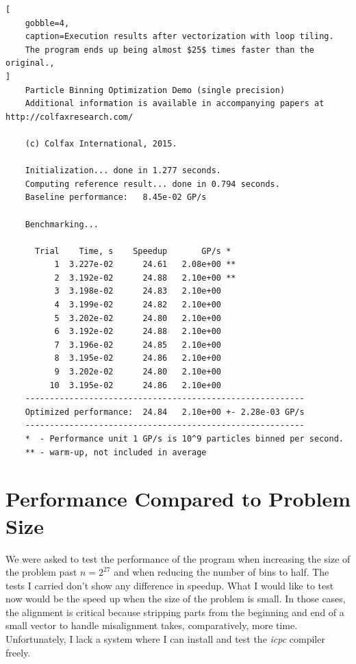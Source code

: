 \documentclass[
    12pt, %
]{fphw}
\newcommand{\icpc}{\textit{icpc}}
\begin{document}
\begin{lstlisting}[
    gobble=4,
    caption=Execution results after vectorization with loop tiling.
    The program ends up being almost $25$ times faster than the original.,
]
    Particle Binning Optimization Demo (single precision)
    Additional information is available in accompanying papers at http://colfaxresearch.com/

    (c) Colfax International, 2015.

    Initialization... done in 1.277 seconds.
    Computing reference result... done in 0.794 seconds.
    Baseline performance:   8.45e-02 GP/s

    Benchmarking...

      Trial    Time, s    Speedup       GP/s *
          1  3.227e-02      24.61   2.08e+00 **
          2  3.192e-02      24.88   2.10e+00 **
          3  3.198e-02      24.83   2.10e+00 
          4  3.199e-02      24.82   2.10e+00 
          5  3.202e-02      24.80   2.10e+00 
          6  3.192e-02      24.88   2.10e+00 
          7  3.196e-02      24.85   2.10e+00 
          8  3.195e-02      24.86   2.10e+00 
          9  3.202e-02      24.80   2.10e+00 
         10  3.195e-02      24.86   2.10e+00 
    ---------------------------------------------------------
    Optimized performance:  24.84   2.10e+00 +- 2.28e-03 GP/s
    ---------------------------------------------------------
    *  - Performance unit 1 GP/s is 10^9 particles binned per second.
    ** - warm-up, not included in average

\end{lstlisting}

\section{Performance Compared to Problem Size}

    We were asked to test the performance of the program
when increasing the size of the problem past $n = 2^{27}$ and
when reducing the number of bins to half.
The tests I carried don't show any difference in speedup.
What I would like to test now would be the speed up when
the size of the problem is small.
In those cases, the alignment is critical because stripping parts
from the beginning and end of a small vector to handle misalignment
takes, comparatively, more time.
Unfortunately, I lack a system where I can install and test the \icpc{} compiler freely.

\end{document}
